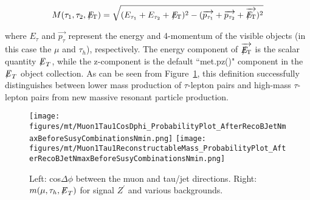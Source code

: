 \begin{equation}
   M(\tau_{1},\tau_{2},{E\!\!\!\!/_{\rm T}}) = \sqrt{(E_{\tau_{1}}+E_{\tau_{2}}+{E\!\!\!\!/_{\rm
T}})^{2}-(\overrightarrow{p_{\tau_{1}}}+\overrightarrow{p_{\tau_{2}}}+\overrightarrow{{E\!\!\!\!/_{\rm T}}})^{2}}
\label{eq:ditaumass}
\end{equation}

where $E_{\tau}$ and $\overrightarrow{p_{\tau}}$ represent the energy and 4-momentum of the visible objects (in this case the $\mu$ and $\tau_{h}$), respectively. 
The energy component of $\overrightarrow{{E\!\!\!\!/_{\rm T}}}$ is the scalar quantity ${\not\mathrel{E}}_T$, while the z-component is the default ``met.pz()" component in the 
${\not\mathrel{E}}_T$ object collection. 
As can be seen from Figure~\ref{fig:MuTauMass}, this definition successfully distinguishes 
between lower mass production of $\tau$-lepton pairs and high-mass $\tau$-lepton pairs from new massive resonant particle production.

\begin{figure}\centering
  \texttt{[image: figures/mt/Muon1Tau1CosDphi\_ProbabilityPlot\_AfterRecoBJetNmaxBeforeSusyCombinationsNmin.png]}
  \texttt{[image: figures/mt/Muon1Tau1ReconstructableMass\_ProbabilityPlot\_AfterRecoBJetNmaxBeforeSusyCombinationsNmin.png]}
  \caption{\label{fig:MuTauMass} Left: cos$\Delta \phi$ between the muon and tau/jet directions.  Right: $m(\mu,\tau_{h},{\not\mathrel{E}}_T)$ for signal $Z^{\prime}$ 
and various backgrounds.}
\end{figure}


